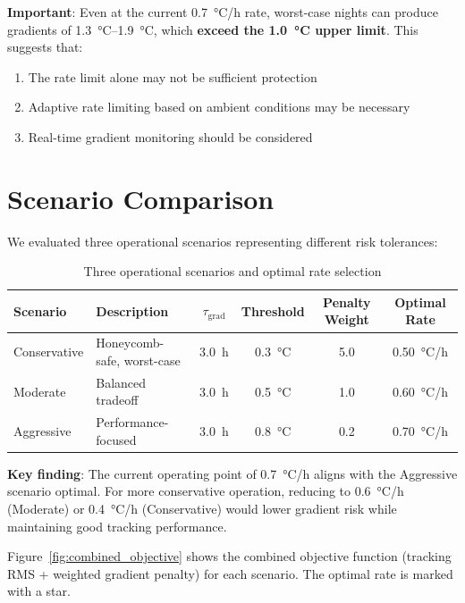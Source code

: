 \documentclass[11pt,a4paper]{article}
\begin{document}
\textcolor{dangerred}{\textbf{Important}}: Even at the current \SI{0.7}{\celsius/h} rate, worst-case nights can produce gradients of \SI{1.3}{\celsius}--\SI{1.9}{\celsius}, which \textbf{exceed the \SI{1.0}{\celsius} upper limit}. This suggests that:
\begin{enumerate}
    \item The rate limit alone may not be sufficient protection
    \item Adaptive rate limiting based on ambient conditions may be necessary
    \item Real-time gradient monitoring should be considered
\end{enumerate}

\section{Scenario Comparison}

We evaluated three operational scenarios representing different risk tolerances:

\begin{table}[H]
\centering
\caption{Three operational scenarios and optimal rate selection}
\label{tab:scenarios}
\begin{tabular}{@{}llcccc@{}}
\toprule
Scenario & Description & $\tau_{\text{grad}}$ & Threshold & Penalty Weight & Optimal Rate \\
\midrule
Conservative & Honeycomb-safe, worst-case & \SI{3.0}{h} & \SI{0.3}{\celsius} & 5.0 & \SI{0.50}{\celsius/h} \\
Moderate & Balanced tradeoff & \SI{3.0}{h} & \SI{0.5}{\celsius} & 1.0 & \SI{0.60}{\celsius/h} \\
Aggressive & Performance-focused & \SI{3.0}{h} & \SI{0.8}{\celsius} & 0.2 & \SI{0.70}{\celsius/h} \\
\bottomrule
\end{tabular}
\end{table}

\textbf{Key finding}: The current operating point of \SI{0.7}{\celsius/h} aligns with the Aggressive scenario optimal. For more conservative operation, reducing to \SI{0.6}{\celsius/h} (Moderate) or \SI{0.4}{\celsius/h} (Conservative) would lower gradient risk while maintaining good tracking performance.

Figure~\ref{fig:combined_objective} shows the combined objective function (tracking RMS + weighted gradient penalty) for each scenario. The optimal rate is marked with a star.
\end{document}

